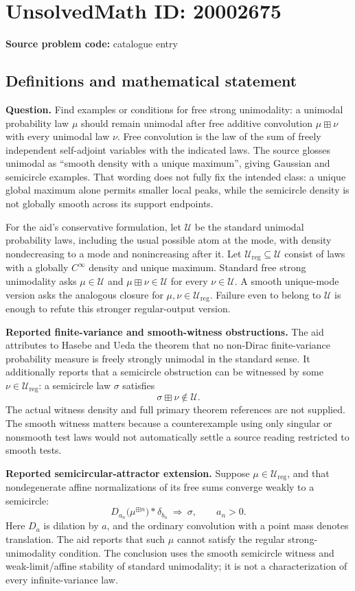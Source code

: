\documentclass[11pt]{article}
\begin{document}
\section*{UnsolvedMath ID: 20002675}
\textbf{Source problem code:} catalogue entry
\subsection{Definitions and mathematical statement}
\textbf{Question.} Find examples or conditions for free strong unimodality: a unimodal probability law \(\mu\) should remain unimodal after free additive convolution \(\mu\boxplus\nu\) with every unimodal law \(\nu\). Free convolution is the law of the sum of freely independent self-adjoint variables with the indicated laws. The source glosses unimodal as ``smooth density with a unique maximum'', giving Gaussian and semicircle examples. That wording does not fully fix the intended class: a unique global maximum alone permits smaller local peaks, while the semicircle density is not globally smooth across its support endpoints.

For the aid's conservative formulation, let \(\mathcal U\) be the standard unimodal probability laws, including the usual possible atom at the mode, with density nondecreasing to a mode and nonincreasing after it. Let \(\mathcal U_{\mathrm{reg}}\subseteq\mathcal U\) consist of laws with a globally \(C^\infty\) density and unique maximum. Standard free strong unimodality asks \(\mu\in\mathcal U\) and \(\mu\boxplus\nu\in\mathcal U\) for every \(\nu\in\mathcal U\). A smooth unique-mode version asks the analogous closure for \(\mu,\nu\in\mathcal U_{\mathrm{reg}}\). Failure even to belong to \(\mathcal U\) is enough to refute this stronger regular-output version.

\textbf{Reported finite-variance and smooth-witness obstructions.} The aid attributes to Hasebe and Ueda the theorem that no non-Dirac finite-variance probability measure is freely strongly unimodal in the standard sense. It additionally reports that a semicircle obstruction can be witnessed by some \(\nu\in\mathcal U_{\mathrm{reg}}\): a semicircle law \(\sigma\) satisfies
\[
 \sigma\boxplus\nu\notin\mathcal U.
\]
The actual witness density and full primary theorem references are not supplied. The smooth witness matters because a counterexample using only singular or nonsmooth test laws would not automatically settle a source reading restricted to smooth tests.

\textbf{Reported semicircular-attractor extension.} Suppose \(\mu\in\mathcal U_{\mathrm{reg}}\), and that nondegenerate affine normalizations of its free sums converge weakly to a semicircle:
\[
 D_{a_n}\bigl(\mu^{\boxplus n}\bigr)*\delta_{b_n}
 \ \Longrightarrow\ \sigma,\qquad a_n>0.
\]
Here \(D_a\) is dilation by \(a\), and the ordinary convolution with a point mass denotes translation. The aid reports that such \(\mu\) cannot satisfy the regular strong-unimodality condition. The conclusion uses the smooth semicircle witness and weak-limit/affine stability of standard unimodality; it is not a characterization of every infinite-variance law.
\end{document}
